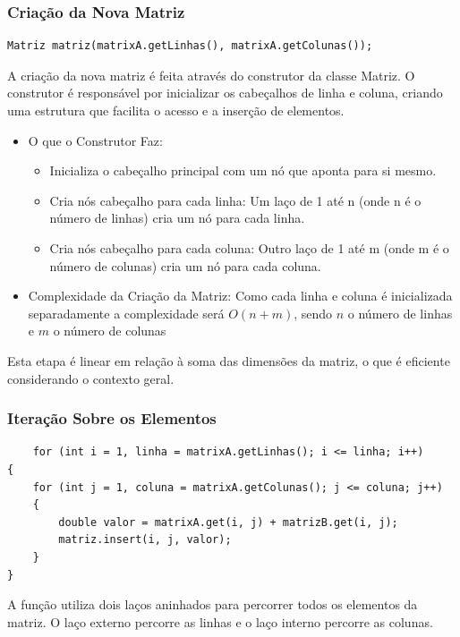 \documentclass[12pt]{article}
\begin{document}
    \subsubsection{Criação da Nova Matriz}
    \begin{lstlisting}
Matriz matriz(matrixA.getLinhas(), matrixA.getColunas());
    \end{lstlisting}
A criação da nova matriz é feita através do construtor da classe Matriz. O construtor é responsável por inicializar os cabeçalhos de linha e coluna, criando uma estrutura que facilita o acesso e a inserção de elementos.
    \begin{itemize}
        \item O que o Construtor Faz:
            \begin{itemize}
                \item Inicializa o cabeçalho principal com um nó que aponta para si mesmo.
                \item Cria nós cabeçalho para cada linha: Um laço de 1 até n (onde n é o número de linhas) cria um nó para cada linha.
                \item Cria nós cabeçalho para cada coluna: Outro laço de 1 até m (onde m é o número de colunas) cria um nó para cada coluna.
            \end{itemize}

        \item Complexidade da Criação da Matriz:
             Como cada linha e coluna é inicializada separadamente a complexidade será \(O(n + m)\), sendo \(n\) o número de linhas e \(m\) o número de colunas

        
    \end{itemize}
            Esta etapa é linear em relação à soma das dimensões da matriz, o que é eficiente considerando o contexto geral.

    \subsubsection{Iteração Sobre os Elementos}
\begin{lstlisting}
    for (int i = 1, linha = matrixA.getLinhas(); i <= linha; i++)
{
    for (int j = 1, coluna = matrixA.getColunas(); j <= coluna; j++)
    {
        double valor = matrixA.get(i, j) + matrizB.get(i, j);
        matriz.insert(i, j, valor);
    }
}
\end{lstlisting}

A função utiliza dois laços aninhados para percorrer todos os elementos da matriz. O laço externo percorre as linhas e o laço interno percorre as colunas.
\end{document}

